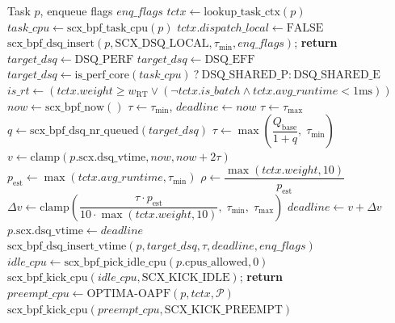 \documentclass[conference]{IEEEtran}
\begin{document}
\begin{algorithm}[t]
\caption{OPTIMA-ENQUEUE (Virtual Deadline Calculus \& OAPF Preemption Kick)}
\label{alg:enqueue}
\begin{algorithmic}[1]
\footnotesize
\REQUIRE Task $p$, enqueue flags $enq\_flags$
\STATE $tctx \leftarrow \text{lookup\_task\_ctx}(p)$
\STATE $task\_cpu \leftarrow \text{scx\_bpf\_task\_cpu}(p)$
    \STATE $tctx.dispatch\_local \leftarrow \text{FALSE}$
    \STATE $\text{scx\_bpf\_dsq\_insert}(p, \text{SCX\_DSQ\_LOCAL}, \tau_{\min}, enq\_flags)$; \textbf{return}
\ENDIF
\STATE {}
    \STATE $target\_dsq \leftarrow \text{DSQ\_PERF}$
    \STATE $target\_dsq \leftarrow \text{DSQ\_EFF}$
\ELSE
    \STATE $target\_dsq \leftarrow \text{is\_perf\_core}(task\_cpu) \ ? \ \text{DSQ\_SHARED\_P} : \text{DSQ\_SHARED\_E}$
\ENDIF
\STATE $is\_rt \leftarrow (tctx.weight \ge w_{\mathrm{RT}} \lor (\neg tctx.is\_batch \land tctx.avg\_runtime < 1\text{ms}))$
\STATE $now \leftarrow \text{scx\_bpf\_now}()$
    \STATE $\tau \leftarrow \tau_{\min}$, \quad $deadline \leftarrow now$
\ELSE
        \STATE $\tau \leftarrow \tau_{\max}$
    \ELSE
        \STATE $q \leftarrow \text{scx\_bpf\_dsq\_nr\_queued}(target\_dsq)$
        \STATE $\tau \leftarrow \max\left( \dfrac{Q_{\mathrm{base}}}{1 + q}, \; \tau_{\min} \right)$
    \ENDIF
    \STATE $v \leftarrow \mathrm{clamp}(p.\text{scx.dsq\_vtime}, now, now + 2\tau)$
    \STATE $p_{\mathrm{est}} \leftarrow \max(tctx.avg\_runtime, \tau_{\min})$
    \STATE $\rho \leftarrow \dfrac{\max(tctx.weight, 10)}{p_{\mathrm{est}}}$ 
    \STATE $\Delta v \leftarrow \mathrm{clamp}\left( \dfrac{\tau \cdot p_{\mathrm{est}}}{10 \cdot \max(tctx.weight, 10)}, \; \tau_{\min}, \; \tau_{\max} \right)$ 
    \STATE $deadline \leftarrow v + \Delta v$
\ENDIF
\STATE $p.\text{scx.dsq\_vtime} \leftarrow deadline$
\STATE $\text{scx\_bpf\_dsq\_insert\_vtime}(p, target\_dsq, \tau, deadline, enq\_flags)$
\STATE {}
\STATE $idle\_cpu \leftarrow \text{scx\_bpf\_pick\_idle\_cpu}(p.\text{cpus\_allowed}, 0)$
    \STATE $\text{scx\_bpf\_kick\_cpu}(idle\_cpu, \text{SCX\_KICK\_IDLE})$; \textbf{return}
\ENDIF
{}
    \STATE $preempt\_cpu \leftarrow \text{OPTIMA-OAPF}(p, tctx, \mathcal{P})$
        \STATE $\text{scx\_bpf\_kick\_cpu}(preempt\_cpu, \text{SCX\_KICK\_PREEMPT})$
    \ENDIF
\ENDIF
\end{algorithmic}
\end{algorithm}
\end{document}
